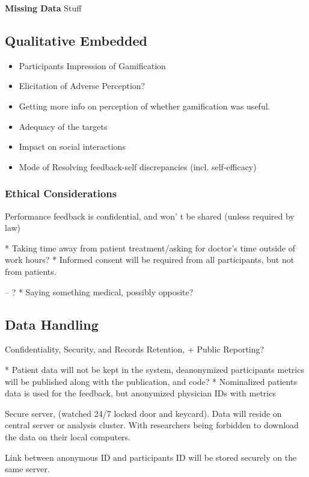 \textbf{Missing Data}
Stuff

\subsection{Qualitative Embedded}

\begin{itemize}
    \item Participants Impression of Gamification
    \item Elicitation of Adverse Perception?
    \item Getting more info on perception of whether gamification was useful.
    \item Adequacy of the targets
    \item Impact on social interactions
    \item Mode of Resolving feedback-self discrepancies (incl. self-efficacy)
\end{itemize}

\subsubsection{Ethical Considerations}
Performance feedback is confidential, and won’ t be shared (unless required by law)


* Taking time away from patient treatment/asking for doctor's time outside of work hours?
* Informed consent will be required from all participants, but not from patients.

-- ?
* Saying something medical, possibly opposite?


\subsection{Data Handling}
Confidentiality, Security, and Records Retention, + Public Reporting?

* Patient data will not be kept in the system, deanonymized participants metrics will be published along with the publication, and code?
* Nominalized patients data is used for the feedback, but anonymized physician IDs with metrics

Secure server, (watched 24/7 locked door and keycard). Data will reside on central server or analysis cluster. With researchers being forbidden to download the data on their local computers.

Link between anonymous ID and participants ID will be stored securely on the same server.
